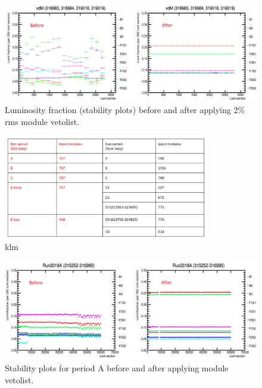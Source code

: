 \begin{figure}[!htp]
\centering
\includegraphics[width=1\textwidth]{ashish_thesis/before_after_vdm_stability.png}
\caption{%
   Luminosity fraction (stability plots) before and after applying 2\% rms module vetolist.
}
\label{fig:b_a_stability_vdm}
\end{figure}





\begin{figure}[!htp]
\centering
\includegraphics[width=0.8\textwidth]{ashish_thesis/old_new_veto.png}
\caption{%
   klm
}
\label{fig:old_new_vetolist}
\end{figure}

\begin{figure}[!htp]
\centering
\includegraphics[width=1\textwidth]{ashish_thesis/2018A_before_after_stability.png}
\caption{%
   Stability plots for period A before and after applying module vetolist.
}
\label{fig:stability_A}
\end{figure}

